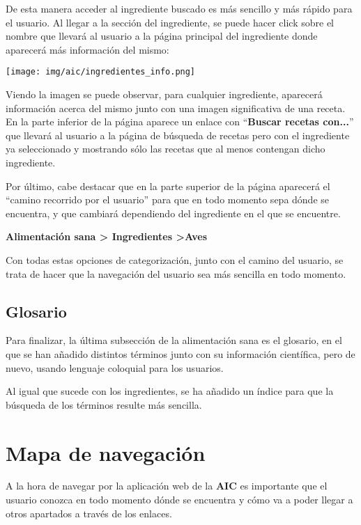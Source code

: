 \documentclass{\ClassPath/viu-tfm-template}
\begin{document}
De esta manera acceder al ingrediente buscado es más sencillo y más rápido para el usuario. Al llegar a la sección del ingrediente, se puede hacer click sobre el nombre que llevará al usuario a la página principal del ingrediente donde aparecerá más información del mismo:

\begin{center}
    \vspace{-10pt}
    \texttt{[image: img/aic/ingredientes\_info.png]}
    \vspace{-20pt}
\end{center}

Viendo la imagen se puede observar, para cualquier ingrediente, aparecerá información acerca del mismo junto con una imagen significativa de una receta. En la parte inferior de la página aparece un enlace con “\textbf{{\color{maincolor}Buscar recetas con...}}” que llevará al usuario a la página de búsqueda de recetas pero con el ingrediente ya seleccionado y mostrando sólo las recetas que al menos contengan dicho ingrediente.

Por último, cabe destacar que en la parte superior de la página aparecerá el “camino recorrido por el usuario” para que en todo momento sepa dónde se encuentra, y que cambiará dependiendo del ingrediente en el que se encuentre.

\begin{center}
    \vspace{-10pt}
    \textbf{{\color{maincolor}Alimentación sana > \space Ingredientes} >\space Aves}
    \vspace{-15pt}
\end{center}

Con todas estas opciones de categorización, junto con el camino del usuario, se trata de hacer que la navegación del usuario sea más sencilla en todo momento.


\section{Glosario}
Para finalizar, la última subsección de la alimentación sana es el glosario, en el que se han añadido distintos términos junto con su información científica, pero de nuevo, usando lenguaje coloquial para los usuarios.

Al igual que sucede con los ingredientes, se ha añadido un índice para que la búsqueda de los términos resulte más sencilla.



\chapter{Mapa de navegación}
A la hora de navegar por la aplicación web de la \textbf{AIC} es importante que el usuario conozca en todo momento dónde se encuentra y cómo va a poder llegar a otros apartados a través de los enlaces.
\end{document}
